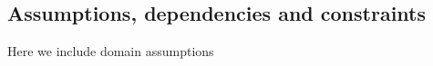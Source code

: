 \begin{flushleft}
\end{flushleft}


\subsection{Assumptions, dependencies and constraints}
Here we include domain assumptions





